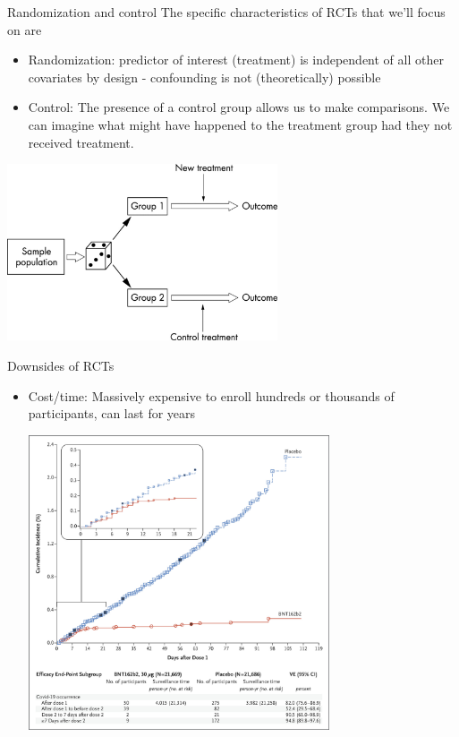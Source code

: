 \documentclass[10pt,t]{beamer}
\begin{document}
\begin{frame}{Randomization and control}
	The specific characteristics of RCTs that we'll focus on are
	\begin{itemize}
		\item Randomization: predictor of interest (treatment) is independent of all other covariates by design - confounding is not (theoretically) possible
		\item Control: The presence of a control group allows us to make comparisons. We can imagine what might have happened to the treatment group had they not received treatment. 
	\end{itemize}
\begin{center}
	\includegraphics[width = 0.6\textwidth]{rct.jpg}
\end{center}
\end{frame}

\begin{frame}{Downsides of RCTs}
	\vspace{-0.8cm}
	\begin{itemize}
		\item Cost/time: Massively expensive to enroll hundreds or thousands of participants, can last for years
		\begin{center}
			\includegraphics[width = 0.7\textwidth]{pfizer.jpeg}
		\end{center}
	\end{itemize}
\end{frame}
\end{document}
